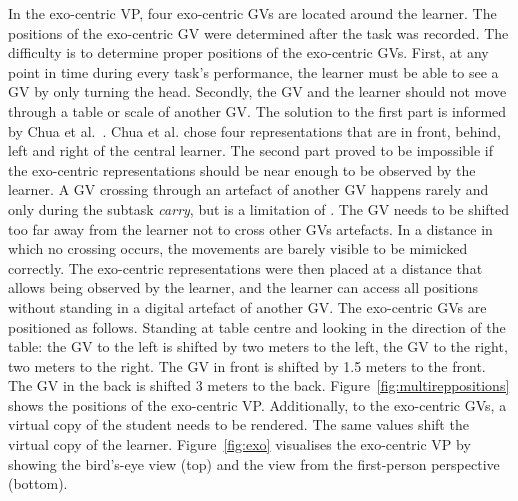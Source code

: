 In the exo-centric VP, four exo-centric GVs are located around the learner. The positions of the exo-centric GV were determined after the task was recorded. The difficulty is to determine proper positions of the exo-centric GVs. First, at any point in time during every task's performance, the learner must be able to see a GV by only turning the head. Secondly, the GV and the learner should not move through a table or scale of another GV. The solution to the first part is informed by Chua et al.~\cite{thaichichua}. Chua et al. chose four representations that are in front, behind, left and right of the central learner. The second part proved to be impossible if the exo-centric representations should be near enough to be observed by the learner. A GV crossing through an artefact of another GV happens rarely and only during the subtask \textit{carry}, but is a limitation of \exgo. The GV needs to be shifted too far away from the learner not to cross other GVs artefacts. In a distance in which no crossing occurs, the movements are barely visible to be mimicked correctly. The exo-centric representations were then placed at a distance that allows being observed by the learner, and the learner can access all positions without standing in a digital artefact of another GV. The exo-centric GVs are positioned as follows. Standing at table centre and looking in the direction of the table: the GV to the left is shifted by two meters to the left, the GV to the right, two meters to the right. The GV in front is shifted by 1.5 meters to the front. The GV in the back is shifted 3 meters to the back. Figure~\ref{fig:multireppositions} shows the positions of the exo-centric VP. Additionally, to the exo-centric GVs, a virtual copy of the student needs to be rendered. The same values shift the virtual copy of the learner. Figure~\ref{fig:exo} visualises the exo-centric VP by showing the bird's-eye view (top) and the view from the first-person perspective (bottom).\\

